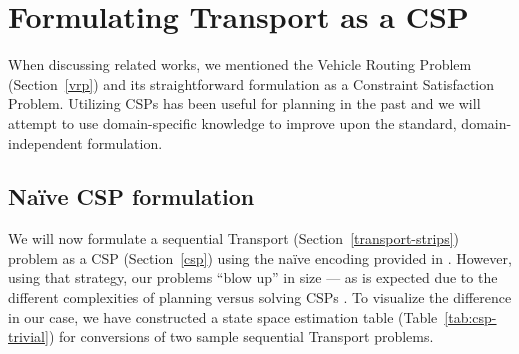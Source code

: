 \section{Formulating Transport as a CSP}\label{csp-formulation}

When discussing related works, we mentioned the Vehicle Routing Problem (Section~\ref{vrp}) and its straightforward
formulation as a Constraint Satisfaction Problem. Utilizing CSPs has been useful
for planning in the past 
and we will attempt to use domain-specific knowledge to improve upon the standard, domain-independent
formulation.

\subsection{Na{\"{i}}ve CSP formulation}

We will now formulate a sequential Transport (Section~\ref{transport-strips}) problem as a CSP (Section~\ref{csp}) using the na{\"{i}}ve encoding provided in \citet[Section~8.3]{Ghallab2004}.
However, using that strategy, our problems ``blow up'' in size --- as is expected due
to the different complexities of planning versus solving CSPs \citep[Section~8.3.2]{Ghallab2004}. To visualize the difference in our case, we have constructed a state space estimation table (Table~\ref{tab:csp-trivial}) for conversions of two sample sequential Transport problems.

